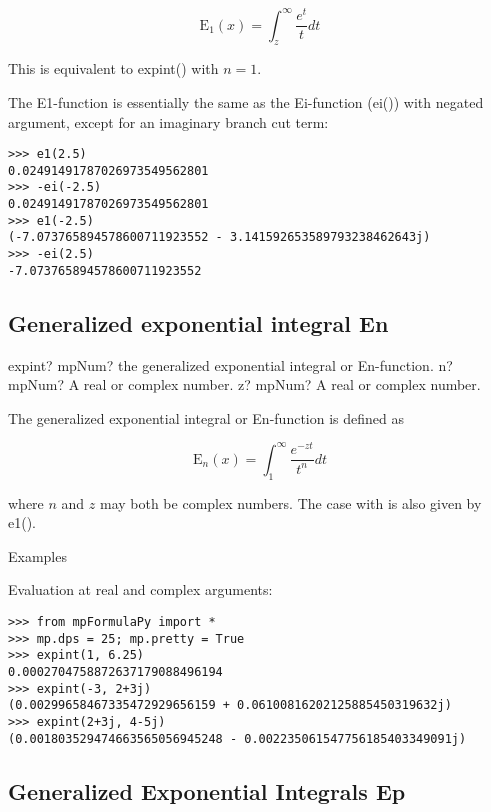 \begin{equation}
\text{E}_1(x) = \int_{z}^{\infty} \frac{e^t}{t} dt
\end{equation}


This is equivalent to expint() with $n=1$.

The E1-function is essentially the same as the Ei-function (ei()) with negated argument, except for an imaginary branch cut term:

\begin{lstlisting}
>>> e1(2.5)
0.02491491787026973549562801
>>> -ei(-2.5)
0.02491491787026973549562801
>>> e1(-2.5)
(-7.073765894578600711923552 - 3.141592653589793238462643j)
>>> -ei(2.5)
-7.073765894578600711923552
\end{lstlisting}



\subsection{Generalized exponential integral En}


\begin{mpFunctionsExtract}
	\mpFunctionTwo
	{expint? mpNum? the generalized exponential integral or En-function.}
	{n? mpNum? A real or complex number.}
	{z? mpNum? A real or complex number.}	
\end{mpFunctionsExtract}


The generalized exponential integral or En-function is defined as


\begin{equation}
\text{E}_n(x) = \int_{1}^{\infty} \frac{e^{-zt}}{t^n} dt
\end{equation}


where $n$ and $z$ may both be complex numbers. The case with is also given by e1().

\vpara
Examples

Evaluation at real and complex arguments:

\begin{lstlisting}
>>> from mpFormulaPy import *
>>> mp.dps = 25; mp.pretty = True
>>> expint(1, 6.25)
0.0002704758872637179088496194
>>> expint(-3, 2+3j)
(0.00299658467335472929656159 + 0.06100816202125885450319632j)
>>> expint(2+3j, 4-5j)
(0.001803529474663565056945248 - 0.002235061547756185403349091j)
\end{lstlisting}




\subsection{Generalized Exponential Integrals Ep}

